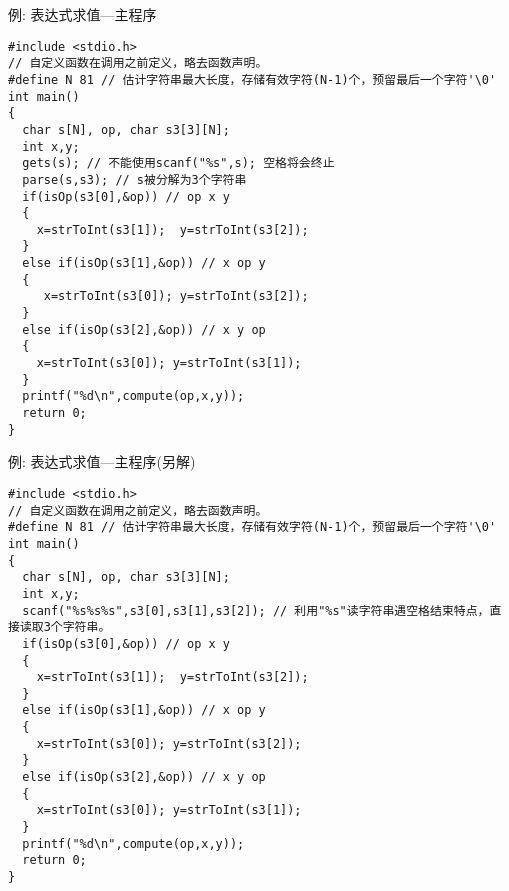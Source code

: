 \begin{frame}{例: 表达式求值---主程序}
\vspace{-0.3cm}
\begin{lstlisting}
#include <stdio.h>
// 自定义函数在调用之前定义，略去函数声明。 
#define N 81 // 估计字符串最大长度，存储有效字符(N-1)个，预留最后一个字符'\0'
int main()
{
  char s[N], op, char s3[3][N];   
  int x,y;
  gets(s); // 不能使用scanf("%s",s); 空格将会终止
  parse(s,s3); // s被分解为3个字符串 
  if(isOp(s3[0],&op)) // op x y
  {
    x=strToInt(s3[1]);  y=strToInt(s3[2]);
  }
  else if(isOp(s3[1],&op)) // x op y
  {
     x=strToInt(s3[0]); y=strToInt(s3[2]);
  }
  else if(isOp(s3[2],&op)) // x y op
  {
    x=strToInt(s3[0]); y=strToInt(s3[1]);
  }
  printf("%d\n",compute(op,x,y)); 
  return 0;
}
\end{lstlisting}
\end{frame}

\begin{frame}{例: 表达式求值---主程序(另解)}
\vspace{-0.3cm}
\begin{lstlisting}
#include <stdio.h>
// 自定义函数在调用之前定义，略去函数声明。
#define N 81 // 估计字符串最大长度，存储有效字符(N-1)个，预留最后一个字符'\0' 
int main()
{
  char s[N], op, char s3[3][N];   
  int x,y;
  scanf("%s%s%s",s3[0],s3[1],s3[2]); // 利用"%s"读字符串遇空格结束特点，直接读取3个字符串。
  if(isOp(s3[0],&op)) // op x y
  {
    x=strToInt(s3[1]);  y=strToInt(s3[2]);
  }
  else if(isOp(s3[1],&op)) // x op y
  {
    x=strToInt(s3[0]); y=strToInt(s3[2]);
  }
  else if(isOp(s3[2],&op)) // x y op
  {
    x=strToInt(s3[0]); y=strToInt(s3[1]);
  }
  printf("%d\n",compute(op,x,y)); 
  return 0;
}
\end{lstlisting}
\end{frame}


